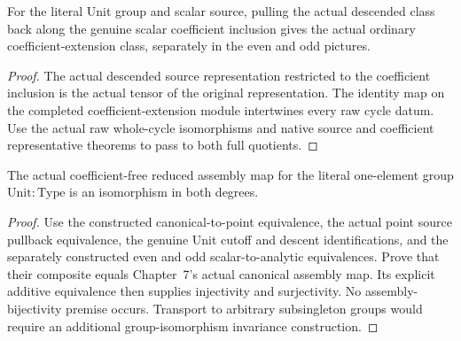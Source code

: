 \begin{proposition}\label{prop:unit-scalar-descent-calibration}
\leanok
For the literal Unit group and scalar source, pulling the actual descended
class back along the genuine scalar coefficient inclusion gives the actual
ordinary coefficient-extension class, separately in the even and odd pictures.
\end{proposition}
\begin{proof}
\leanok
The actual descended source representation restricted to the coefficient
inclusion is the actual tensor of the original representation. The identity
map on the completed coefficient-extension module intertwines every raw
cycle datum. Use the actual raw whole-cycle isomorphisms and native source
and coefficient representative theorems to pass to both full quotients.
\end{proof}

\begin{theorem}\label{thm:baum-connes-unit}
\leanok
The actual coefficient-free reduced assembly map for the literal one-element
group $\mathrm{Unit}:\mathrm{Type}$ is an isomorphism in both degrees.
\end{theorem}
\begin{proof}
\leanok
Use the constructed canonical-to-point equivalence, the actual point source
pullback equivalence, the genuine Unit cutoff and descent identifications,
and the separately constructed even and odd scalar-to-analytic equivalences.
Prove that their composite equals Chapter~7's actual canonical assembly map.
Its explicit additive equivalence then supplies injectivity and surjectivity.
No assembly-bijectivity premise occurs. Transport to arbitrary subsingleton
groups would require an additional group-isomorphism invariance construction.
\end{proof}

